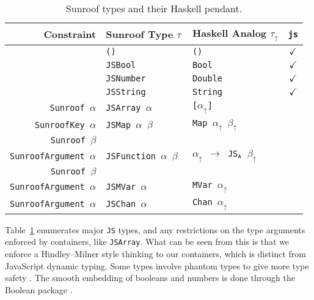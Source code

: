 \documentclass{llncs}
\newcommand{\HaskellAnalog}[1]{#1\ensuremath{_\uparrow}}
\newcommand{\Src}[1]{{\tt{#1}}}
\begin{document}
\begin{table}[t]
\begin{center}
\begin{tabular}{r@{\quad}l@{\quad}l@{\quad}c}
\hline\rule{0pt}{12pt}%
  Constraint
  & Sunroof Type $\tau$
  & Haskell Analog \HaskellAnalog{$\tau$}
  & \Src{js} \\ \hline\rule{0pt}{12pt}%
  
  & \Src{()}       & \Src{()}     & $\checkmark$ \\
  & \Src{JSBool}   & \Src{Bool}   & $\checkmark$ \\
  & \Src{JSNumber} & \Src{Double} & $\checkmark$ \\
  & \Src{JSString} & \Src{String} & $\checkmark$ \\
  
  \Src{Sunroof $\alpha$}
  & \Src{JSArray $\alpha$} 
  & \Src{[$\HaskellAnalog{\alpha}$]}
  & \\
  
  \Src{SunroofKey $\alpha$}
  & \Src{JSMap $\alpha$ $\beta$}
  & \Src{Map $\HaskellAnalog{\alpha}$ $\HaskellAnalog{\beta}$}
  & \\
  \Src{Sunroof $\beta$} \\
  
  \Src{SunroofArgument $\alpha$}
  & \Src{JSFunction $\alpha$ $\beta$ }
  & \Src{$\HaskellAnalog{\alpha}$ $\rightarrow$ JS$_\Src{A}$ $\HaskellAnalog{\beta}$} 
  & \\
  \Src{Sunroof $\beta$} \\
  
  \Src{SunroofArgument $\alpha$}
  & \Src{JSMVar $\alpha$}
  & \Src{MVar $\HaskellAnalog{\alpha}$}
  & \\
  
  \Src{SunroofArgument $\alpha$}
  & \Src{JSChan $\alpha$}
  & \Src{Chan $\HaskellAnalog{\alpha}$}
  & \\[2pt]
\hline
\end{tabular}
\end{center}
\caption{Sunroof types and their Haskell pendant.}
\label{tab:sunroof-types}
\end{table} 


Table~\ref{tab:sunroof-types} enumerates major \Src{JS} types,
and any restrictions on the type arguments enforced by containers,
like \Src{JSArray}. What can be seen from this is that we
enforce a Hindley–Milner style thinking to our containers,
which is distinct from JavaScript dynamic typing.
Some types involve 
phantom types to give more type safety \cite{Cheney:03:FirstClassPhantomTypes}.
The smooth embedding of booleans and numbers is done through
the Boolean package \cite{project:boolean}.
\end{document}
